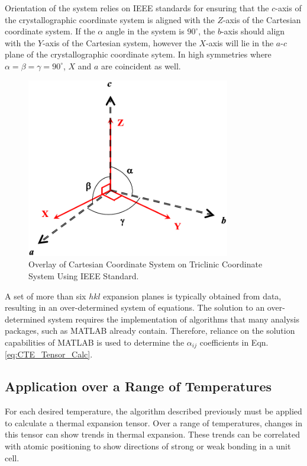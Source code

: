 Orientation of the system relies on IEEE standards for ensuring that the $c$-axis of the crystallographic coordinate system is aligned with the $Z$-axis of the Cartesian coordinate system.  If the $\alpha$ angle in the system is $90^\circ$, the $b$-axis should align with the $Y$-axis of the Cartesian system, however the $X$-axis will lie in the $a$-$c$ plane of the crystallographic coordinate sytem.  In high symmetries where $\alpha=\beta=\gamma=90^\circ$, $X$ and $a$ are coincident as well.

\begin{figure}[htpd]
\begin{center}
 \includegraphics[width=3.5in,bb=0 0 565 498,keepaspectratio=true]{./Figures/Crystal_Axes.png}
 \end{center}
 \caption{Overlay of Cartesian Coordinate System on Triclinic Coordinate System Using IEEE Standard.}
 \label{fig:Axis_Overlay}
\end{figure} 

A set of more than six $hkl$ expansion planes is typically obtained from data, resulting in an over-determined system of equations.  The solution to an over-determined system requires the implementation of algorithms that many analysis packages, such as MATLAB already contain.  Therefore, reliance on the solution capabilities of MATLAB is used to determine the $\alpha_{ij}$ coefficients in Eqn. \ref{eq:CTE_Tensor_Calc}.  

\subsection{Application over a Range of Temperatures}
For each desired temperature, the algorithm described previously must be applied to calculate a thermal expansion tensor.  Over a range of temperatures, changes in this tensor can show trends in thermal expansion.  These trends can be correlated with atomic positioning to show directions of strong or weak bonding in a unit cell.

